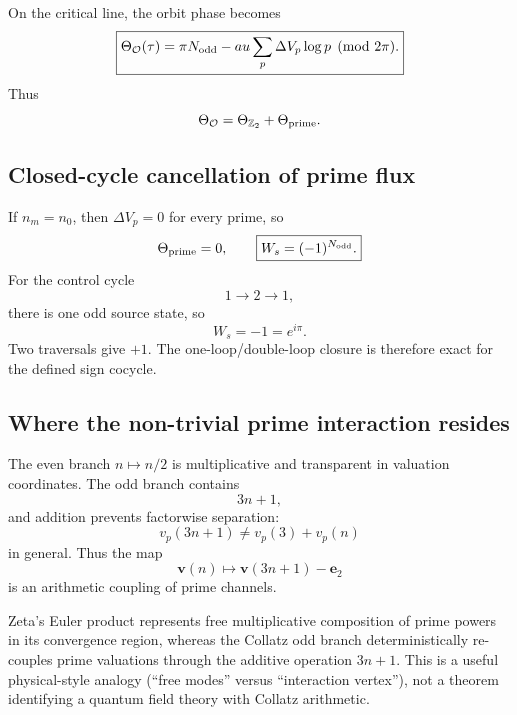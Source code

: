 On the critical line, the orbit phase becomes
\begin{equation}
\boxed{
\Theta_{\mathcal O}(\tau)
=
\pi N_{\rm odd}
-	au\sum_p\Delta V_p\log p
\pmod{2\pi}.
}
\label{eq:prime-phase}
\end{equation}
Thus
\begin{equation}
\Theta_{\mathcal O}=\Theta_{\mathbb Z_2}+\Theta_{\rm prime}.
\end{equation}

\subsection{Closed-cycle cancellation of prime flux}

If \(n_m=n_0\), then \(\Delta V_p=0\) for every prime, so
\begin{equation}
\Theta_{\rm prime}=0,
\qquad
\boxed{W_s=(-1)^{N_{\rm odd}}.}
\end{equation}
For the control cycle
\begin{equation}
1\to2\to1,
\end{equation}
there is one odd source state, so
\begin{equation}
\boxed{W_s=-1=e^{i\pi}.}
\end{equation}
Two traversals give \(+1\). The one-loop/double-loop closure is therefore exact for the defined sign cocycle.

\subsection{Where the non-trivial prime interaction resides}

The even branch \(n\mapsto n/2\) is multiplicative and transparent in valuation coordinates. The odd branch contains
\begin{equation}
3n+1,
\end{equation}
and addition prevents factorwise separation:
\begin{equation}
v_p(3n+1)\neq v_p(3)+v_p(n)
\end{equation}
in general. Thus the map
\begin{equation}
\mathbf v(n)\mapsto\mathbf v(3n+1)-\mathbf e_2
\end{equation}
is an arithmetic coupling of prime channels.

\INTERP
Zeta's Euler product represents free multiplicative composition of prime powers in its convergence region, whereas the Collatz odd branch deterministically re-couples prime valuations through the additive operation \(3n+1\). This is a useful physical-style analogy (``free modes'' versus ``interaction vertex''), not a theorem identifying a quantum field theory with Collatz arithmetic.

